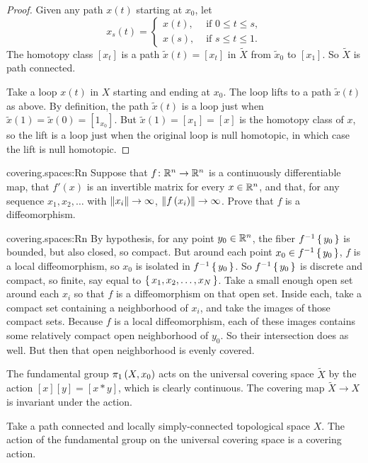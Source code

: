 \begin{proof}
Given any path \(x(t)\) starting at \(x_0\), let 
\[
x_s(t)
=
\begin{cases}
x(t), & \text{ if \(0 \le t \le s\)}, \\
x(s), & \text{ if \(s \le t \le 1\)}.
\end{cases}
\]
The homotopy class \(\left[x_t\right]\) is a path \(\tilde{x}(t)=\left[x_t\right]\) in \(\tilde{X}\) from \(\tilde{x}_0\) to \(\left[x_1\right]\).
So \(\tilde{X}\) is path connected.

Take a loop \(x(t)\) in \(X\) starting and ending at \(x_0\).
The loop lifts to a path \(\tilde{x}(t)\) as above.
By definition, the path \(\tilde{x}(t)\) is a loop just when \(\tilde{x}(1)=\tilde{x}(0)=\left[1_{x_0}\right]\).
But \(\tilde{x}(1)=\left[x_1\right]=\left[x\right]\) is the homotopy class of \(x\), so the lift is a loop just when the original loop is null homotopic, in which case the lift is null homotopic.
\end{proof}
\begin{problem}{covering.spaces:Rn}
Suppose that \(f \colon \mathbb{R}^{n} \to \mathbb{R}^{n}\) is a continuously differentiable map, that \(f'(x)\) is an invertible matrix for every \(x \in \mathbb{R}^{n}\), and that, for any sequence \(x_1, x_2, \dots\) with \(\left\|x_i\right\| \to \infty\), \(\left\|f\left(x_i\right)\right\| \to \infty\).
Prove that \(f\) is a diffeomorphism.
\end{problem}
\begin{answer}{covering.spaces:Rn}
By hypothesis, for any point \(y_0 \in \mathbb{R}^{n}\), the fiber \(f^{-1}\set{y_0}\) is bounded, but also closed, so compact.
But around each point \(x_0 \in f^{-1}\set{y_0}\), \(f\) is a local diffeomorphism, so \(x_0\) is isolated in \(f^{-1}\set{y_0}\).
So \(f^{-1}\set{y_0}\) is discrete and compact, so finite, say equal to \(\set{x_1,x_2,\dots,x_N}\).
Take a small enough open set around each \(x_i\) so that \(f\) is a diffeomorphism on that open set.
Inside each, take a compact set containing a neighborhood of \(x_i\), and take the images of those compact sets.
Because \(f\) is a local diffeomorphism, each of these images contains some relatively compact open neighborhood of \(y_0\).
So their intersection does as well.
But then that open neighborhood is evenly covered.
\end{answer}
The fundamental group \(\pi_{1}\left(X,x_0\right)\) acts on the universal covering space \(\tilde{X}\) by the action \([x][y]=[x*y]\), which is clearly continuous. 
The covering map \(\tilde{X} \to X\) is invariant under the action.
\begin{lemma}
Take a path connected and locally simply-connected topological space \(X\).
The action of the fundamental group on the universal covering space is a covering action.
\end{lemma}
